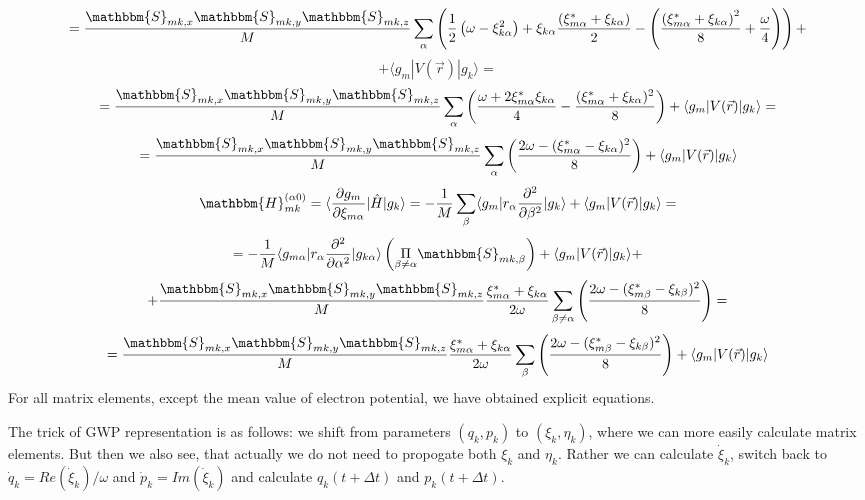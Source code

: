 $$=\frac{\mathbbm{S}_{mk,x}\mathbbm{S}_{mk,y}\mathbbm{S}_{mk,z}}{M}%
		       \sum_{\alpha}\left( \frac{1}{2}\left(\omega-\xi_{k\alpha}^2\right)+%
		       \xi_{k\alpha}\frac{\left(\xi_{m\alpha}^*+\xi_{k\alpha}\right)}{2}-%
		       \left(\frac{\left(\xi_{m\alpha}^*+\xi_{k\alpha}\right)^2}{8}+\frac{\omega}{4}\right)\right)+$$
$$+\langle g_m|V(\vec{r})|g_k\rangle=$$
$$=\frac{\mathbbm{S}_{mk,x}\mathbbm{S}_{mk,y}\mathbbm{S}_{mk,z}}{M}%
   \sum_{\alpha}\left(\frac{\omega+2\xi_{m\alpha}^*\xi_{k\alpha}}{4}-\frac{(\xi_{m\alpha}^*+\xi_{k\alpha})^2}{8} \right)+\langle g_m|V(\vec{r})|g_k\rangle=$$
$$=\frac{\mathbbm{S}_{mk,x}\mathbbm{S}_{mk,y}\mathbbm{S}_{mk,z}}{M}%
   \sum_{\alpha}\left(\frac{2\omega-(\xi_{m\alpha}^*-\xi_{k\alpha})^2}{8} \right)+\langle g_m|V(\vec{r})|g_k\rangle$$
$$\mathbbm{H}_{mk}^{(\alpha0)}=\langle\frac{\partial g_m}{\partial\xi_{m\alpha}}|\hat{H}|g_k\rangle=%
  -\frac{1}{M}\sum_{\beta}\langle g_m|r_{\alpha}\frac{\partial^2}{\partial\beta^2}|g_k\rangle+\langle g_m|V(\vec{r})|g_k\rangle=$$
$$=-\frac{1}{M}\langle g_{m\alpha}|r_{\alpha}\frac{\partial^2}{\partial\alpha^2}|g_{k\alpha}\rangle\left(\underset{\beta\neq\alpha}{\Pi}\mathbbm{S}_{mk,\beta}\right)+%
   \langle g_m|V(\vec{r})|g_k\rangle+$$
$$ +\frac{\mathbbm{S}_{mk,x}\mathbbm{S}_{mk,y}\mathbbm{S}_{mk,z}}{M}\frac{\xi_{m\alpha}^*+\xi_{k\alpha}}{2\omega}%
    \sum_{\beta\neq\alpha}\left(\frac{2\omega-(\xi_{m\beta}^*-\xi_{k\beta})^2}{8}\right)=$$
$$=\frac{\mathbbm{S}_{mk,x}\mathbbm{S}_{mk,y}\mathbbm{S}_{mk,z}}{M}\frac{\xi_{m\alpha}^*+\xi_{k\alpha}}{2\omega}%
    \sum_{\beta}\left(\frac{2\omega-(\xi_{m\beta}^*-\xi_{k\beta})^2}{8}\right)+\langle g_m|V(\vec{r})|g_k\rangle$$
For all matrix elements, except the mean value of electron potential, we have obtained explicit equations.

The trick of GWP representation is as follows: we shift from parameters $(q_k,p_k)$ to $(\xi_k,\eta_k)$, 
where we can more easily calculate matrix elements.
But then we also see, that actually we do not need to propogate both $\xi_k$ and $\eta_k$.
Rather we can calculate $\dot{\xi}_k$, switch back to $\dot{q}_k=\mathit{Re}(\dot{\xi}_k)/\omega$ 
and $\dot{p}_k=\mathit{Im}(\dot{\xi}_k)$ and calculate $q_k(t+\Delta t)$ and $p_k(t+\Delta t)$.


